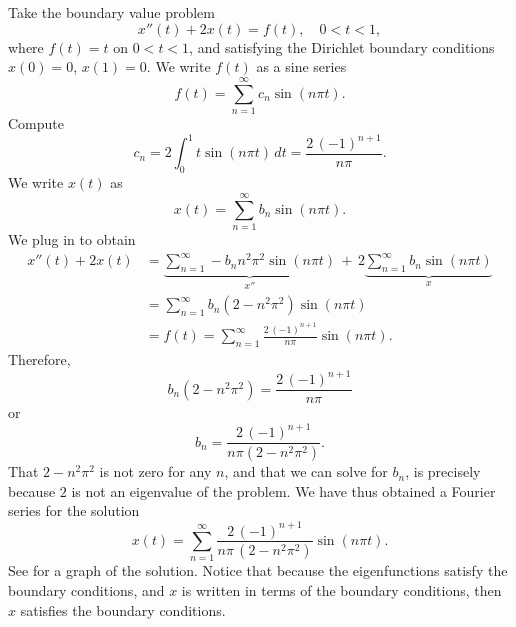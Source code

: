 \begin{example}
Take the boundary value problem
\begin{equation*}
x''(t) + 2 x(t) = f(t) ,
\quad
0 < t < 1,
\end{equation*}
where $f(t) = t$ on $0 < t < 1$, and 
satisfying the Dirichlet boundary conditions
$x(0) = 0$, $x(1)=0$.
We write $f(t)$ as a sine series
\begin{equation*}
f(t) = \sum_{n=1}^\infty c_n \sin (n \pi t) .
\end{equation*}
Compute
\begin{equation*}
c_n = 2 \int_0^1 t \sin (n \pi t) \,dt = \frac{2 \, {(-1)}^{n+1}}{n \pi} .
\end{equation*}
We write $x(t)$ as
\begin{equation*}
x(t) = \sum_{n=1}^\infty b_n \sin (n \pi t) .
\end{equation*}
We plug in to obtain 
\begin{equation*}
\begin{split}
x''(t) + 2 x(t) & =
\underbrace{
\sum_{n=1}^\infty - b_n n^2 \pi^2 \sin (n \pi t)
}_{x''}
\,
+
\,
2
\underbrace{
\sum_{n=1}^\infty b_n \sin (n \pi t)
}_{x}
\\
& =
\sum_{n=1}^\infty b_n (2 - n^2 \pi^2 ) \sin (n \pi t)
\\
& = f(t)
=
\sum_{n=1}^\infty  \frac{2\, {(-1)}^{n+1}}{n \pi} \sin (n \pi t) .
\end{split}
\end{equation*}
Therefore,
\begin{equation*}
b_n (2 - n^2 \pi^2)
=
\frac{2\,{(-1)}^{n+1}}{n \pi}
\end{equation*}
or
\begin{equation*}
b_n
=
\frac{2\,{(-1)}^{n+1}}{n \pi (2 - n^2 \pi^2)} .
\end{equation*}
That $2-n^2\pi^2$ is not zero for any $n$, and that we can
solve for $b_n$, is precisely because
$2$ is not an eigenvalue of the problem.
We have thus obtained a Fourier series for the solution
\begin{equation*}
x(t) = 
\sum_{n=1}^\infty
\frac{2\,{(-1)}^{n+1}}{n \pi \,(2 - n^2 \pi^2)}
\sin (n \pi t) .
\end{equation*}
See  for a graph of the solution.
Notice that because the eigenfunctions satisfy the boundary conditions, 
and $x$ is written in terms of the boundary conditions, then $x$
satisfies the boundary conditions.
\begin{myfig}
\capstart
{}
\caption{Plot of the solution of $x''+2x=t$, $x(0)=0$, $x(1)=0$.%
\label{bnd-dirich-graph:fig}}
\end{myfig}
\end{example}

